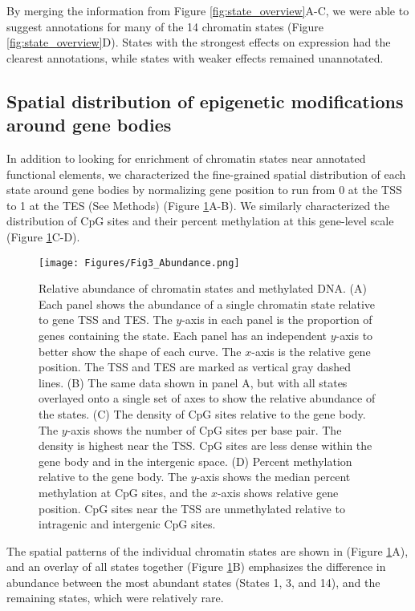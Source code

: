 \documentclass[
  11pt,
]{article}
\begin{document}
By merging the information from Figure \ref{fig:state_overview}A-C, we
were able to suggest annotations for many of the 14 chromatin states
(Figure \ref{fig:state_overview}D). States with the strongest effects on
expression had the clearest annotations, while states with weaker
effects remained unannotated.

\hypertarget{spatial-distribution-of-epigenetic-modifications-around-gene-bodies}{%
\subsection{Spatial distribution of epigenetic modifications around gene
bodies}\label{spatial-distribution-of-epigenetic-modifications-around-gene-bodies}}

In addition to looking for enrichment of chromatin states near annotated
functional elements, we characterized the fine-grained spatial
distribution of each state around gene bodies by normalizing gene
position to run from 0 at the TSS to 1 at the TES (See Methods) (Figure
\ref{fig:state_abundance}A-B). We similarly characterized the
distribution of CpG sites and their percent methylation at this
gene-level scale (Figure \ref{fig:state_abundance}C-D).

\begin{figure}[ht!]
\texttt{[image: Figures/Fig3\_Abundance.png]} 
\caption{Relative abundance of chromatin states and methylated DNA. (A) Each panel 
shows the abundance of a single chromatin state relative to gene TSS and TES. The 
$y$-axis in each panel is the proportion of genes containing the state. Each
panel has an independent $y$-axis to better show the shape of each curve.
The $x$-axis is the relative gene position. The TSS and TES are marked as vertical
gray dashed lines. (B) The same data shown in panel A, but with all states overlayed
onto a single set of axes to show the relative abundance of the states. 
(C) The density of CpG sites relative to the gene body. The $y$-axis shows the 
number of CpG sites per base pair. The density is highest near the TSS. 
CpG sites are less dense within the gene body and in the intergenic space. 
(D) Percent methylation relative to the gene body. The $y$-axis shows the median 
percent methylation at CpG sites, and the $x$-axis shows relative gene position. 
CpG sites near the TSS are unmethylated relative to intragenic and intergenic
CpG sites.}
\label{fig:state_abundance}
\end{figure}

The spatial patterns of the individual chromatin states are shown in
(Figure \ref{fig:state_abundance}A), and an overlay of all states
together (Figure \ref{fig:state_abundance}B) emphasizes the difference
in abundance between the most abundant states (States 1, 3, and 14), and
the remaining states, which were relatively rare.
\end{document}
